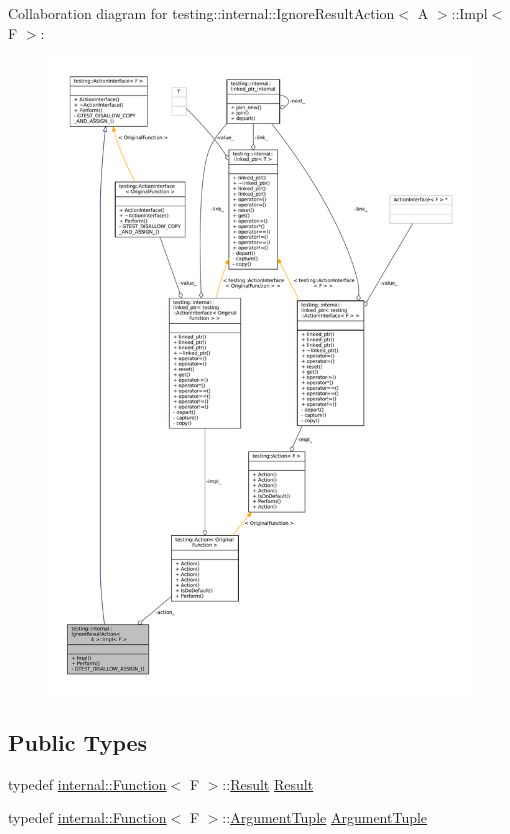 Collaboration diagram for testing\+:\+:internal\+:\+:Ignore\+Result\+Action$<$ A $>$\+:\+:Impl$<$ F $>$\+:
\nopagebreak
\begin{figure}[H]
\begin{center}
\leavevmode
\includegraphics[width=350pt]{classtesting_1_1internal_1_1IgnoreResultAction_1_1Impl__coll__graph}
\end{center}
\end{figure}
\subsection*{Public Types}
\begin{DoxyCompactItemize}
\item 
typedef \hyperlink{structtesting_1_1internal_1_1Function}{internal\+::\+Function}$<$ F $>$\+::\hyperlink{classtesting_1_1ActionInterface_a7477de2fe3e4e01c59db698203acaee7}{Result} \hyperlink{classtesting_1_1internal_1_1IgnoreResultAction_1_1Impl_a5848be04a86b1149840d04eca6e0bc80}{Result}
\item 
typedef \hyperlink{structtesting_1_1internal_1_1Function}{internal\+::\+Function}$<$ F $>$\+::\hyperlink{classtesting_1_1ActionInterface_af72720d864da4d606629e83edc003511}{Argument\+Tuple} \hyperlink{classtesting_1_1internal_1_1IgnoreResultAction_1_1Impl_a1e3be49f0be40b497a57fc462ed3fa23}{Argument\+Tuple}
\end{DoxyCompactItemize}

